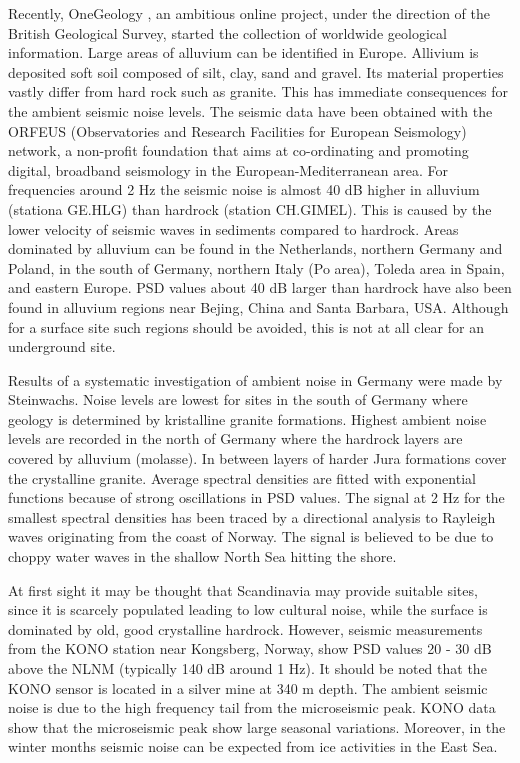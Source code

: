 \medskip
\noindent
Recently, OneGeology \cite{onegeology}, an ambitious online project, under the direction of the British Geological Survey, started the collection of worldwide geological information. Large areas of alluvium can be identified in Europe. Allivium is deposited soft soil composed of silt, clay, sand and gravel. Its material properties vastly differ from hard rock such as granite. This has immediate consequences for the ambient seismic noise levels. The seismic data have been obtained with the ORFEUS (Observatories and Research Facilities for European Seismology) network, a non-profit foundation that aims at co-ordinating and promoting digital, broadband seismology in the European-Mediterranean area. For frequencies around 2 Hz the seismic noise is almost 40 dB higher in alluvium (stationa GE.HLG) than hardrock (station CH.GIMEL). This is caused by the lower velocity of seismic waves in sediments compared to hardrock. Areas dominated by alluvium can be found in the Netherlands, northern Germany and Poland, in the south of Germany, northern Italy (Po area), Toleda area in Spain, and eastern Europe. PSD values about 40 dB larger than hardrock have also been found in alluvium regions near Bejing, China and Santa Barbara, USA. Although for a surface site such regions should be avoided, this is not at all clear for an underground site.

\medskip
\noindent
Results of a systematic investigation of ambient noise in Germany \cite{steinwachs} were made by Steinwachs. Noise levels are lowest for sites in the south of Germany where geology is determined by kristalline granite formations. Highest ambient noise levels are recorded in the north of Germany where the hardrock layers are covered by alluvium (molasse). In between layers of harder Jura formations cover the crystalline granite. Average spectral densities are fitted with exponential functions because of strong oscillations in PSD values. The signal at 2 Hz for the smallest spectral densities has been traced by a directional analysis to Rayleigh waves originating from the coast of Norway. The signal is believed to be due to choppy water waves in the shallow North Sea hitting the shore.

\medskip
\noindent
At first sight it may be thought that Scandinavia may provide suitable sites, since it is scarcely populated leading to low cultural noise, while the surface is dominated by old, good crystalline hardrock. However, seismic measurements from the KONO station near Kongsberg, Norway, show PSD values 20 - 30 dB above the NLNM (typically 140 dB around 1 Hz). It should be noted that the KONO sensor is located in a silver mine at 340 m depth. The ambient seismic noise is due to the high frequency tail from the microseismic peak. KONO data show that the microseismic peak show large seasonal variations. Moreover, in the winter months seismic noise can be expected from ice activities in the East Sea.




